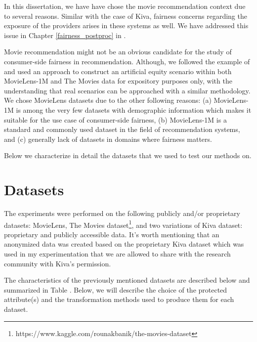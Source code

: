     In this dissertation, we have have chose the movie recommendation context due to several reasons. Similar with the case of Kiva, fairness concerns regarding the exposure of the providers arises in these systems as well. We have addressed this issue in Chapter \ref{fairness_postproc} in \cite{sonboli2020opportunistic,liu2019farpfar} .
    
    Movie recommendation might not be an obvious candidate for the study of consumer-side fairness in recommendation. Although, we followed the example of \cite{yao2017beyond} and used an approach to construct an artificial equity scenario within both MovieLens-1M and The Movies data for expository purposes only, with the understanding that real scenarios can be approached with a similar methodology. We chose MovieLens datasets due to the other following reasons: (a) MovieLens-1M is among the very few datasets with demographic information which makes it suitable for the use case of consumer-side fairness, (b) MovieLens-1M is a standard and commonly used dataset in the field of recommendation systems, and (c) generally lack of datasets in domains where fairness matters.

    Below we characterize in detail the datasets that we used to test our methods on.

\section{Datasets}

The experiments were performed on the following publicly and/or proprietary datasets: MovieLens\cite{movielens}, The Movies dataset\footnote{https://www.kaggle.com/rounakbanik/the-movies-dataset}, and two variations of Kiva dataset: proprietary and publicly accessible data.
It's worth mentioning that an anonymized data was created based on the proprietary Kiva dataset which was used in my experimentation that we are allowed to share with the research community with Kiva's permission.



The characteristics of the previously mentioned datasets are described below and summarized in Table . Below, we will describe the choice of the protected attribute(s) and the transformation methods used to produce them for each dataset.

